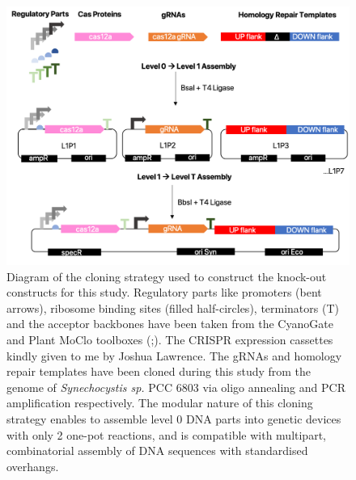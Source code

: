 \begin{figure}[H]
    \centering
    \includegraphics[width=0.8\hsize]{figs/KOstrategy.png}
    \caption{Diagram of the cloning strategy used to construct the knock-out constructs for this study. Regulatory parts like promoters (bent arrows), ribosome binding sites (filled half-circles), terminators (T) and the acceptor backbones have been taken from the CyanoGate and Plant MoClo toolboxes (\citealt{Vasudevan2019};\citealt{Engler2014}). The CRISPR expression cassettes kindly given to me by Joshua Lawrence. The gRNAs and homology repair templates have been cloned during this study from the genome of \textit{Synechocystis sp.} PCC 6803 via oligo annealing and PCR amplification respectively. The modular nature of this cloning strategy enables to assemble level 0 DNA parts into genetic devices with only 2 one-pot reactions, and is compatible with multipart, combinatorial assembly of DNA sequences with standardised overhangs.
}
\label{fig:kostra}
\end{figure}


